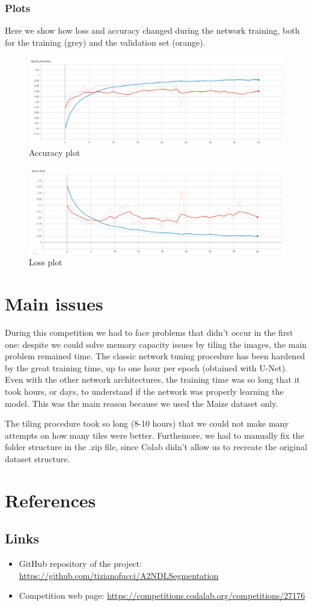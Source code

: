 \documentclass[12pt,a4paper]{report}
\begin{document}
\subsection{Plots}
Here we show how loss and accuracy changed during the network training, both for the training (grey) and the validation set (orange).
\begin{figure}[H]
	\includegraphics[scale = 0.5, center]{ResNet accuracy}
	\caption{Accuracy plot}
\end{figure}
\begin{figure}[H]
	\includegraphics[scale = 0.5, center]{ResNet loss}
	\caption{Loss plot}
\end{figure}
		

\chapter{Main issues}
During this competition we had to face problems that didn't occur in the first one: despite we could solve memory capacity issues by tiling the images, the main problem remained time. The classic network tuning procedure has been hardened by the great training time, up to one hour per epoch (obtained with U-Net). Even with the other network architectures, the training time was so long that it took hours, or days, to understand if the network was properly learning the model. This was the main reason because we used the Maize dataset only.

The tiling procedure took so long (8-10 hours) that we could not make many attempts on how many tiles were better. Furthemore, we had to manually fix the folder structure in the .zip file, since Colab didn't allow us to recreate the original dataset structure.
	\chapter{References}
		\section{Links}

\begin{itemize}
	\item GitHub repository of the project: \url{https://github.com/tizianofucci/A2NDLSegmentation}
	\item Competition web page: \url{https://competitions.codalab.org/competitions/27176}
\end{itemize}
\end{document}

